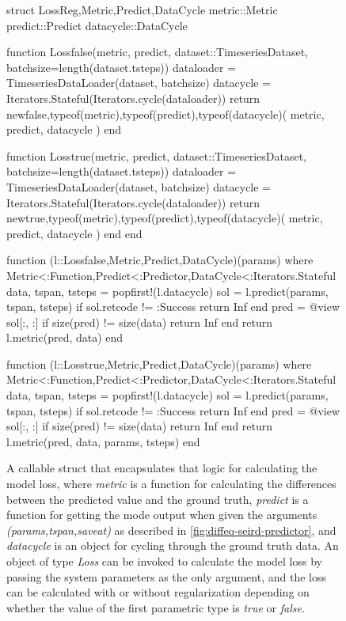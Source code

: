 \begin{figure}[!htb]
\begin{jllisting}
struct Loss{Reg,Metric,Predict,DataCycle}
    metric::Metric
    predict::Predict
    datacycle::DataCycle

    function Loss{false}(metric, predict, dataset::TimeseriesDataset,
                         batchsize=length(dataset.tsteps))
        dataloader = TimeseriesDataLoader(dataset, batchsize)
        datacycle = Iterators.Stateful(Iterators.cycle(dataloader))
        return new{false,typeof(metric),typeof(predict),typeof(datacycle)}(
            metric, predict, datacycle
        )
    end

    function Loss{true}(metric, predict, dataset::TimeseriesDataset,
                        batchsize=length(dataset.tsteps))
        dataloader = TimeseriesDataLoader(dataset, batchsize)
        datacycle = Iterators.Stateful(Iterators.cycle(dataloader))
        return new{true,typeof(metric),typeof(predict),typeof(datacycle)}(
            metric, predict, datacycle
        )
    end
end

function (l::Loss{false,Metric,Predict,DataCycle})(params)
where {Metric<:Function,Predict<:Predictor,DataCycle<:Iterators.Stateful}
    data, tspan, tsteps = popfirst!(l.datacycle)
    sol = l.predict(params, tspan, tsteps)
    if sol.retcode != :Success
        return Inf
    end
    pred = @view sol[:, :]
    if size(pred) != size(data)
        return Inf
    end
    return l.metric(pred, data)
end

function (l::Loss{true,Metric,Predict,DataCycle})(params)
where {Metric<:Function,Predict<:Predictor,DataCycle<:Iterators.Stateful}
    data, tspan, tsteps = popfirst!(l.datacycle)
    sol = l.predict(params, tspan, tsteps)
    if sol.retcode != :Success
        return Inf
    end
    pred = @view sol[:, :]
    if size(pred) != size(data)
        return Inf
    end
    return l.metric(pred, data, params, tsteps)
end
\end{jllisting}
\caption[Julia implementation of a helper struct for defining the loss function]{A callable struct that encapsulates that logic for calculating the model loss, where \textit{metric} is a function for calculating the differences between the predicted value and the ground truth, \textit{predict} is a function for getting the mode output when given the arguments \textit{(params,tspan,saveat)} as described in \autoref{fig:diffeq-seird-predictor}, and \textit{datacycle} is an object for cycling through the ground truth data. An object of type \textit{Loss} can be invoked to calculate the model loss by passing the system parameters as the only argument, and the loss can be calculated with or without regularization depending on whether the value of the first parametric type is \textit{true} or \textit{false}.}
\label{fig:diffeq-seird-loss}
\end{figure}